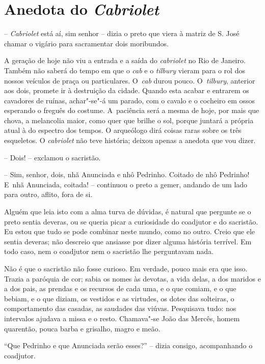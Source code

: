 \chapter{Anedota do \emph{Cabriolet}}

-- \emph{Cabriolet} está aí, sim senhor -- dizia o preto que viera à
matriz de S. José chamar o vigário para sacramentar dois moribundos.

A geração de hoje não viu a entrada e a saída do \emph{cabriolet} no Rio
de Janeiro. Também não saberá do tempo em que o \emph{cab} e o
\emph{tilbury} vieram para o rol dos nossos veículos de praça ou
particulares. O~\emph{cab} durou pouco. O~\emph{tilbury}, anterior aos
dois, promete ir à destruição da cidade. Quando esta acabar e entrarem
os cavadores de ruínas, achar"-se"-á um parado, com o cavalo e o cocheiro
em ossos esperando o freguês do costume. A~paciência será a mesma de
hoje, por mais que chova, a melancolia maior, como quer que brilhe o
sol, porque juntará a própria atual à do espectro dos tempos. O
arqueólogo dirá coisas raras sobre os três esqueletos. O
\emph{cabriolet} não teve história; deixou apenas a anedota que vou
dizer.

-- Dois! -- exclamou o sacristão.

-- Sim, senhor, dois, nhã Anunciada e nhô Pedrinho. Coitado de nhô
Pedrinho! E~nhã Anunciada, coitada! -- continuou o preto a gemer,
andando de um lado para outro, aflito, fora de si.

Alguém que leia isto com a alma turva de dúvidas, é natural que pergunte
se o preto sentia deveras, ou se queria picar a curiosidade do coadjutor
e do sacristão. Eu estou que tudo se pode combinar neste mundo, como no
outro. Creio que ele sentia deveras; não descreio que ansiasse por dizer
alguma história terrível. Em todo caso, nem o coadjutor nem o sacristão
lhe perguntavam nada.

Não é que o sacristão não fosse curioso. Em verdade, pouco mais era que
isso. Trazia a paróquia de cor; sabia os nomes às devotas, a vida delas,
a dos maridos e a dos pais, as prendas e os recursos de cada uma, e o
que comiam, e o que bebiam, e o que diziam, os vestidos e as virtudes,
os dotes das solteiras, o comportamento das casadas, as saudades das
viúvas. Pesquisava tudo: nos intervalos ajudava a missa e o resto.
Chamava"-se João das Mercês, homem quarentão, pouca barba e grisalho,
magro e meão.

``Que Pedrinho e que Anunciada serão esses?'' -- dizia consigo,
acompanhando o coadjutor.

